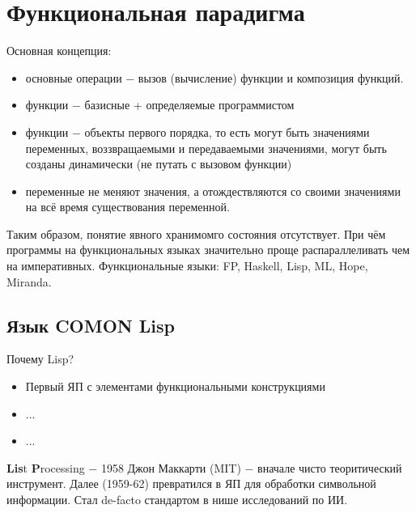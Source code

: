 \documentclass[a4paper, 12pt, titlepage, finall]{extreport}
\begin{document}
    \chapter{Функциональная парадигма}
        Основная концепция:
        \begin{itemize}
            \item основные операции $-$ вызов (вычисление) функции и композиция функций.
            \item функции $-$ базисные + определяемые программистом
            \item функции $-$ объекты первого порядка, то есть могут быть значениями переменных, воззвращаемыми
                и передаваемыми значениями, могут быть созданы динамически (не путать с вызовом функции)
            \item переменные не меняют значения, а отождествляются со своими значениями на всё время существования переменной.
        \end{itemize}
        Таким образом, понятие явного хранимомго состояния отсутствует. 
        При чём программы на функциональных языках значительно проще распараллеливать чем на императивных.
        Функциональные языки: FP, Haskell, Lisp, ML, Hope, Miranda.
        \section{Язык COMON Lisp}
            Почему Lisp?
            \begin{itemize}
                \item Первый ЯП с элементами функциональными конструкциями
                \item ...
                \item ...
            \end{itemize}

            \textbf{Lis}t \textbf{P}rocessing $-$ 1958 Джон Маккарти (MIT) $-$ вначале чисто теоритический инструмент.
            Далее (1959-62) превратился в ЯП для обработки символьной информации. Стал de-facto стандартом в нише исследований по ИИ.
            
\end{document}
